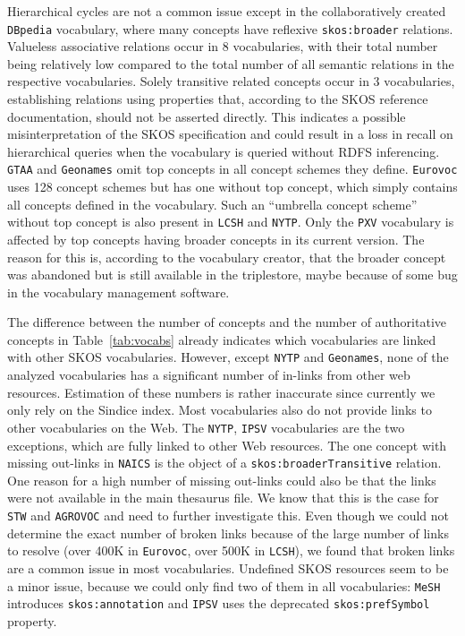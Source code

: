 Hierarchical cycles are not a common issue except in the collaboratively created \texttt{DBpedia} vocabulary, where many concepts have reflexive \texttt{skos:broader} relations.
Valueless associative relations occur in 8 vocabularies, with their total number being relatively low compared to the total number of all semantic relations in the respective vocabularies.
Solely transitive related concepts occur in 3 vocabularies, establishing relations using properties that, according to the SKOS reference documentation, should not be asserted directly. This indicates a possible misinterpretation of the SKOS specification and could result in a loss in recall on hierarchical queries when the vocabulary is queried without RDFS inferencing.
\texttt{GTAA} and \texttt{Geonames} omit top concepts in all concept schemes they define. \texttt{Eurovoc} uses 128 concept schemes but has one without top concept, which simply contains all concepts defined in the vocabulary. Such an ``umbrella concept scheme'' without top concept is also present in \texttt{LCSH} and \texttt{NYTP}.
Only the \texttt{PXV} vocabulary is affected by top concepts having broader concepts in its current version. The reason for this is, according to the vocabulary creator, that the broader concept was abandoned but is still available in the triplestore, maybe because of some bug in the vocabulary management software.


The difference between the number of concepts and the number of authoritative concepts in Table~\ref{tab:vocabs} already indicates which vocabularies are linked with other SKOS vocabularies.
However, except \texttt{NYTP} and \texttt{Geonames}, none of the analyzed vocabularies has a significant number of in-links from other web resources. Estimation of these numbers is rather inaccurate since currently we only rely on the Sindice index. 
Most vocabularies also do not provide links to other vocabularies on the Web. The \texttt{NYTP}, \texttt{IPSV} vocabularies are the two exceptions, which are fully linked to other Web resources. The one concept with missing out-links in \texttt{NAICS} is the object of a \texttt{skos:broaderTransitive} relation. One reason for a high number of missing out-links could also be that the links were not available in the main thesaurus file. We know that this is the case for \texttt{STW} and \texttt{AGROVOC} and need to further investigate this.
Even though we could not determine the exact number of broken links because of the large number of links to resolve  (over 400K in \texttt{Eurovoc}, over 500K in \texttt{LCSH}), we found that broken links are a common issue in most vocabularies.
Undefined SKOS resources seem to be a minor issue, because we could only find two of them in all vocabularies: \texttt{MeSH} introduces \texttt{skos:annotation} and \texttt{IPSV} uses the deprecated \texttt{skos:prefSymbol} property.
